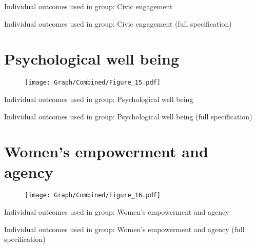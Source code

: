 \documentclass[10pt,a4paper]{article}
\begin{document}
\begin{table}[H]\centering\caption{Individual outcomes used in group: Civic engagement }
\resizebox{\textwidth}{!}{}
\end{table}
\begin{table}[H]\centering\caption{Individual outcomes used in group: Civic engagement (full specification)}
\resizebox{\textwidth}{!}{}
\end{table}
\pagebreak
\section{Psychological well being}
\begin{table}[H]\centering

\end{table}
\begin{figure}[H]\centering
\texttt{[image: Graph/Combined/Figure\_15.pdf]}
\caption{} \label{fig:Fig_15}
\end{figure}

\begin{table}[H]\centering\caption{Individual outcomes used in group: Psychological well being }
\resizebox{\textwidth}{!}{}
\end{table}
\begin{table}[H]\centering\caption{Individual outcomes used in group: Psychological well being (full specification)}
\resizebox{\textwidth}{!}{}
\end{table}
\pagebreak
\section{Women's empowerment and agency}
\begin{table}[H]\centering

\end{table}
\begin{figure}[H]\centering
\texttt{[image: Graph/Combined/Figure\_16.pdf]}
\caption{} \label{fig:Fig_16}
\end{figure}

\begin{table}[H]\centering\caption{Individual outcomes used in group: Women's empowerment and agency }
\resizebox{\textwidth}{!}{}
\end{table}
\begin{table}[H]\centering\caption{Individual outcomes used in group: Women's empowerment and agency (full specification)}
\resizebox{\textwidth}{!}{}
\end{table}
\pagebreak
\end{document}

